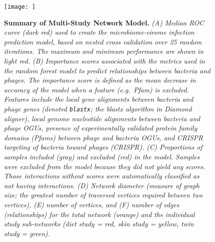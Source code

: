 \documentclass[12pt,]{article}
\begin{document}
\begin{figure}[htbp]
\centering
\texttt{[image: ]}
\caption{\textbf{Summary of Multi-Study Network Model.} \emph{(A) Median
ROC curve (dark red) used to create the microbiome-virome infection
prediction model, based on nested cross validation over 25 random
iterations. The maximum and minimum performance are shown in light red.
(B) Importance scores associated with the metrics used in the random
forest model to predict relationships between bacteria and phages. The
importance score is defined as the mean decrease in accuracy of the
model when a feature (e.g.~Pfam) is excluded. Features include the local
gene alignments between bacteria and phage genes (denoted
\texttt{blastx}; the blastx algorithm in Diamond aligner), local genome
nucleotide alignments between bacteria and phage OGUs, presence of
experimentally validated protein family domains (Pfams) between phage
and bacteria OGUs, and CRISPR targeting of bacteria toward phages
(CRISPR). (C) Proportions of samples included (gray) and excluded (red)
in the model. Samples were excluded from the model because they did not
yield any scores. Those interactions without scores were automatically
classified as not having interactions. (D) Network diameter (measure of
graph size; the greatest number of traversed vertices required between
two vertices), (E) number of vertices, and (F) number of edges
(relationships) for the total network (orange) and the individual study
sub-networks (diet study = red, skin study = yellow, twin study =
green).} \label{RocCurve}}
\end{figure}
\end{document}
